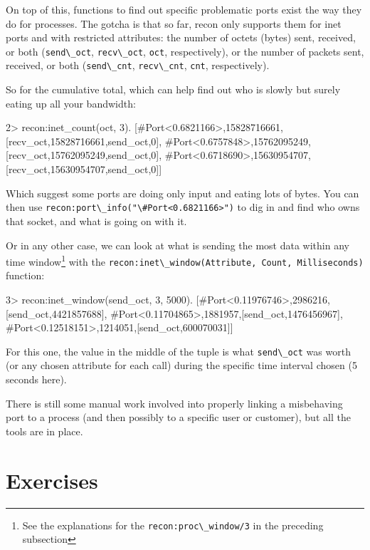 \documentclass[11pt, oneside]{book}   	%
\newcommand{\function}[1]{\Verb`#1`}
\newcommand{\expression}[1]{\Verb`#1`}
\begin{document}
On top of this, functions to find out specific problematic ports exist the way they do for processes. The gotcha is that so far, recon only supports them for inet ports and with restricted attributes: the number of octets (bytes) sent, received, or both (\expression{send\_oct}, \expression{recv\_oct}, \expression{oct}, respectively), or the number of packets sent, received, or both (\expression{send\_cnt}, \expression{recv\_cnt}, \expression{cnt}, respectively).

So for the cumulative total, which can help find out who is slowly but surely eating up all your bandwidth:

\begin{VerbatimEshell}
2> recon:inet_count(oct, 3).
[{#Port<0.6821166>,15828716661,
  [{recv_oct,15828716661},{send_oct,0}]},
 {#Port<0.6757848>,15762095249,
  [{recv_oct,15762095249},{send_oct,0}]},
 {#Port<0.6718690>,15630954707,
  [{recv_oct,15630954707},{send_oct,0}]}]
\end{VerbatimEshell}

Which suggest some ports are doing only input and eating lots of bytes. You can then use \function{recon:port\_info("\#Port<0.6821166>")} to dig in and find who owns that socket, and what is going on with it.

Or in any other case, we can look at what is sending the most data within any time window\footnote{See the explanations for the \function{recon:proc\_window/3} in the preceding subsection} with the \function{recon:inet\_window(Attribute, Count, Milliseconds)} function:

\begin{VerbatimEshell}
3> recon:inet_window(send_oct, 3, 5000).
[{#Port<0.11976746>,2986216,[{send_oct,4421857688}]},
 {#Port<0.11704865>,1881957,[{send_oct,1476456967}]},
 {#Port<0.12518151>,1214051,[{send_oct,600070031}]}]
\end{VerbatimEshell}

For this one, the value in the middle of the tuple is what \expression{send\_oct} was worth (or any chosen attribute for each call) during the specific time interval chosen (5 seconds here).

There is still some manual work involved into properly linking a misbehaving port to a process (and then possibly to a specific user or customer), but all the tools are in place. 


\section{Exercises}
\end{document}
